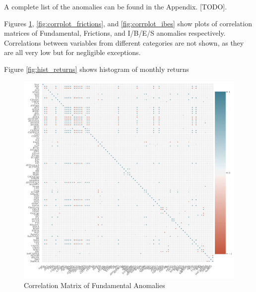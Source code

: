 	A complete list of the anomalies can be found in the Appendix. [TODO]. 
	
	Figures \ref{fig:corrplot_funds}, \ref{fig:corrplot_frictions}, and \ref{fig:corrplot_ibes} show plots of correlation matrices of Fundamental, Frictions, and I/B/E/S anomalies respectively. Correlations between variables from different categories are not shown, as they are all very low but for negligible exceptions. 
		
	Figure \ref{fig:hist_returns} shows histogram of monthly returns 


	\begin{center}
		\begin{figure}
			\includegraphics[width=\textwidth,height=\textheight,keepaspectratio]{Figures/corrplot_funds.pdf}
			\caption{Correlation Matrix of Fundamental Anomalies}
			\label{fig:corrplot_funds}
		\end{figure}
	\end{center}
	
